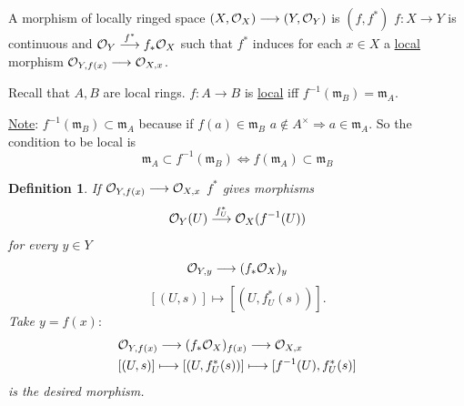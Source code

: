 \documentclass[11pt]{article}
\newtheorem{dfn}[thm]{Definition}
\newcommand{\scm}{{\mathfrak m}}
\newcommand{\calo}{{\cal O}}
\newcommand{\Lrta}{\Longrightarrow}
\newcommand{\lrta}{\longrightarrow}
\newcommand{\Llrta}{\Longleftrightarrow}
\begin{document}
A morphism of locally ringed space $(X,\calo_X)\lrta (Y,\calo_Y)$
 is $(f,f^*)$ $f:X\lrta Y$ is continuous and $\calo_Y\overset{f^*}{\lrta}f_*\calo_X$ such that $f^*$ induces for each $x\in X$ a \underline{local} morphism 
$\calo_{Y,f(x)}\lrta\calo_{X,x}$.

Recall that $A,B$ are local rings. $f: A\lrta B$ is \underline{local} iff $f^{-1}(\scm_B)=\scm_A$. 

\underline{Note}: $f^{-1}(\scm_B)\subset \scm_A$ because if $f(a)\in \scm_B$ $a\notin A^\times\Lrta a\in \scm_A$. So the condition to be local is 
$$
\scm_A\subset f^{-1}(\scm_B)\Llrta f(\scm_A)\subset \scm_B
$$

\begin{dfn}
If $\calo_{Y,f(x)}\lrta \calo_{X,x}$ $f^*$ gives  morphisms 
$$
\calo_Y(U)\overset{f^*_U}{\lrta}\calo_X(f^{-1}(U))
$$
for every $y\in Y$
$$
\calo_{Y,y}\lrta (f_*\calo_X)_y
$$
$$
[(U,s)]\longmapsto [(U,f^*_U(s))].
$$
Take $y=f(x):$
$$
\begin{aligned}
&\calo_{Y,f(x)}\lrta (f_*\calo_X)_{f(x)}\lrta \calo_{X,x}\\
& [(U,s)]\longmapsto [(U,f^*_U(s))]\longmapsto[f^{-1}(U),f^*_U(s)]
\end{aligned}
$$
is the desired morphism.
\end{dfn}
\end{document}
